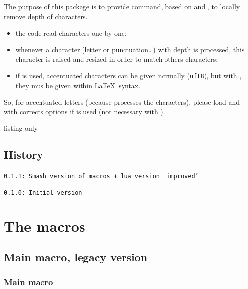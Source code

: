 \documentclass[11pt,a4paper]{ltxdoc}
\begin{document}
The purpose of this package is to provide command, based on \ShowCode{\\raisebox} and \ShowCode{\\resizebox}, to locally remove depth of characters.

\begin{itemize}
	\item the code read characters one by one;
	\item whenever a character (letter or punctuation\ldots) with depth is processed, this character is raised and resized in order to match others characters;
	\item if  is used, accentuated characters can be given normally (\texttt{uft8}), but with , they mus be given within \LaTeX\ syntax.
\end{itemize}

So, for accentuated letters (because  processes the characters), please load  and  with corrects options if  is used (not necessary with ).

\begin{DemoCode}{listing only}
\usepackage[T1]{fontenc}
\usepackage[utf8]{inputenc}
\end{DemoCode}

\vfill

\subsection{History}

\texttt{0.1.1: Smash version of macros + lua version 'improved'}

\texttt{0.1.0: Initial version}

\vspace*{5mm}

\pagebreak

\section{The macros}

\subsection{Main macro, legacy version}

\subsubsection{Main macro}
\end{document}
